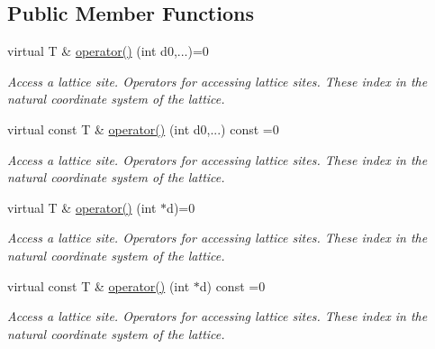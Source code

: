 \subsection*{Public Member Functions}
\begin{DoxyCompactItemize}
\item 
\mbox{\label{classsisl_1_1base__lattice_a45737aef697099b47f539a6084c81a15}} 
virtual T \& \hyperlink{classsisl_1_1base__lattice_a45737aef697099b47f539a6084c81a15}{operator()} (int d0,...)=0
\begin{DoxyCompactList}\small\item\em Access a lattice site. Operators for accessing lattice sites. These index in the natural coordinate system of the lattice. \end{DoxyCompactList}\item 
\mbox{\label{classsisl_1_1base__lattice_ad2193e17c508f1f476164a4494ecba87}} 
virtual const T \& \hyperlink{classsisl_1_1base__lattice_ad2193e17c508f1f476164a4494ecba87}{operator()} (int d0,...) const =0
\begin{DoxyCompactList}\small\item\em Access a lattice site. Operators for accessing lattice sites. These index in the natural coordinate system of the lattice. \end{DoxyCompactList}\item 
\mbox{\label{classsisl_1_1base__lattice_ac95ec229ba562861dbfd7c43130e3d5f}} 
virtual T \& \hyperlink{classsisl_1_1base__lattice_ac95ec229ba562861dbfd7c43130e3d5f}{operator()} (int $\ast$d)=0
\begin{DoxyCompactList}\small\item\em Access a lattice site. Operators for accessing lattice sites. These index in the natural coordinate system of the lattice. \end{DoxyCompactList}\item 
\mbox{\label{classsisl_1_1base__lattice_a51e4e2d9717669822dc797b05742db48}} 
virtual const T \& \hyperlink{classsisl_1_1base__lattice_a51e4e2d9717669822dc797b05742db48}{operator()} (int $\ast$d) const =0
\begin{DoxyCompactList}\small\item\em Access a lattice site. Operators for accessing lattice sites. These index in the natural coordinate system of the lattice. \end{DoxyCompactList}\item 

\end{DoxyCompactItemize}
